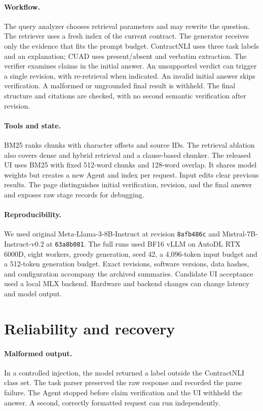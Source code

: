 \documentclass{article}
\begin{document}
\paragraph{Workflow.} The query analyzer chooses retrieval parameters and may rewrite the question. The retriever uses a fresh index of the current contract. The generator receives only the evidence that fits the prompt budget. ContractNLI uses three task labels and an explanation; CUAD uses present/absent and verbatim extraction. The verifier examines claims in the initial answer. An unsupported verdict can trigger a single revision, with re-retrieval when indicated. An invalid initial answer skips verification. A malformed or ungrounded final result is withheld. The final structure and citations are checked, with no second semantic verification after revision.

\paragraph{Tools and state.} BM25 ranks chunks with character offsets and source IDs. The retrieval ablation also covers dense and hybrid retrieval and a clause-based chunker. The released UI uses BM25 with fixed 512-word chunks and 128-word overlap. It shares model weights but creates a new Agent and index per request. Input edits clear previous results. The page distinguishes initial verification, revision, and the final answer and exposes raw stage records for debugging.

\paragraph{Reproducibility.} We used original Meta-Llama-3-8B-Instruct \citep{llama3} at revision \texttt{8afb486c} and Mistral-7B-Instruct-v0.2 \citep{mistral} at \texttt{63a8b081}. The full runs used BF16 vLLM on AutoDL RTX 6000D, eight workers, greedy generation, seed 42, a 4,096-token input budget and a 512-token generation budget. Exact revisions, software versions, data hashes, and configuration accompany the archived summaries. Candidate UI acceptance used a local MLX backend. Hardware and backend changes can change latency and model output.

\section{Reliability and recovery}
\paragraph{Malformed output.} In a controlled injection, the model returned a label outside the ContractNLI class set. The task parser preserved the raw response and recorded the parse failure. The Agent stopped before claim verification and the UI withheld the answer. A second, correctly formatted request can run independently.
\end{document}
